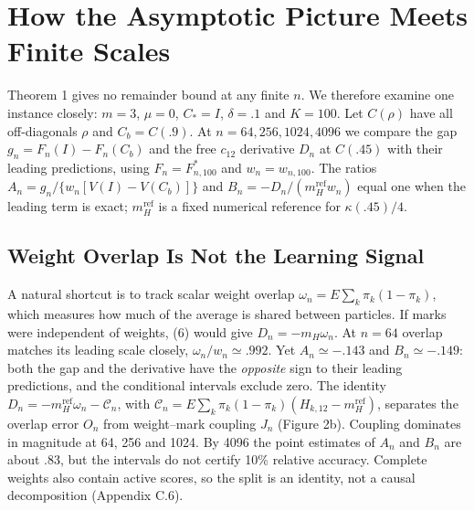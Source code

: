 \documentclass{article}
\begin{document}
\section{How the Asymptotic Picture Meets Finite
Scales}\label{how-the-asymptotic-picture-meets-finite-scales}

Theorem 1 gives no remainder bound at any finite \(n\). We therefore
examine one instance closely: \(m=3\), \(\mu=0\), \(C_*=I\),
\(\delta=.1\) and \(K=100\). Let \(C(\rho)\) have all off-diagonals
\(\rho\) and \(C_b=C(.9)\). At \(n=64,256,1024,4096\) we compare the gap
\(g_n=F_n(I)-F_n(C_b)\) and the free \(c_{12}\) derivative \(D_n\) at
\(C(.45)\) with their leading predictions, using \(F_n=F_{n,100}^*\) and
\(w_n=w_{n,100}\). The ratios \(A_n=g_n/\{w_n[V(I)-V(C_b)]\}\) and
\(B_n=-D_n/(m_H^{\mathrm{ref}}w_n)\) equal one when the leading term is
exact; \(m_H^{\mathrm{ref}}\) is a fixed numerical reference for
\(\kappa(.45)/4\).

\subsection{Weight Overlap Is Not the Learning
Signal}\label{weight-overlap-is-not-the-learning-signal}

A natural shortcut is to track scalar weight overlap
\(\omega_n=E\sum_k\pi_k(1-\pi_k)\), which measures how much of the
average is shared between particles. If marks were independent of
weights, (6) would give \(D_n=-m_H\omega_n\). At \(n=64\) overlap
matches its leading scale closely, \(\omega_n/w_n\simeq.992\). Yet
\(A_n\simeq-.143\) and \(B_n\simeq-.149\): both the gap and the
derivative have the \emph{opposite} sign to their leading predictions,
and the conditional intervals exclude zero. The identity
\(D_n=-m_H^{\mathrm{ref}}\omega_n-\mathcal C_n\), with
\(\mathcal C_n=E\sum_k\pi_k(1-\pi_k)(H_{k,12}-m_H^{\mathrm{ref}})\),
separates the overlap error \(O_n\) from weight--mark coupling \(J_n\)
(Figure 2b). Coupling dominates in magnitude at 64, 256 and 1024. By
4096 the point estimates of \(A_n\) and \(B_n\) are about \(.83\), but
the intervals do not certify 10\% relative accuracy. Complete weights
also contain active scores, so the split is an identity, not a causal
decomposition (Appendix C.6).
\end{document}
